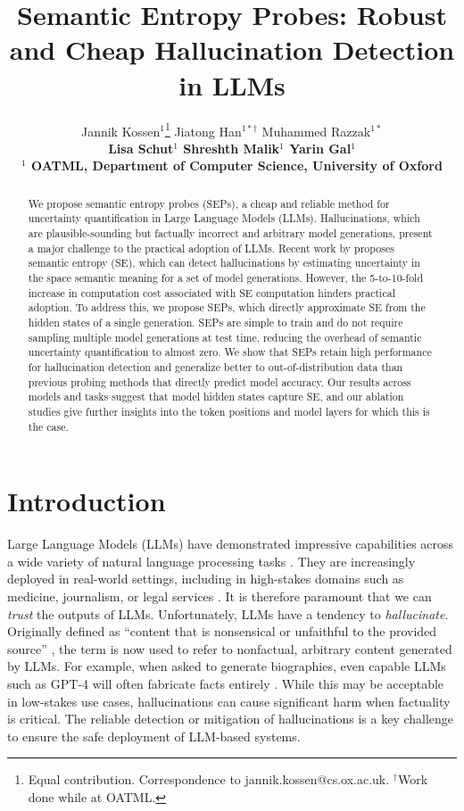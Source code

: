 \documentclass{article}
\title{Semantic Entropy Probes: Robust and Cheap Hallucination Detection in LLMs}
\author{%
  Jannik Kossen$^{1}$\thanks{Equal contribution. Correspondence to jannik.kossen@cs.ox.ac.uk. $^\dagger$Work done while at OATML.}
  \phantom{123}
  Jiatong Han$^{1*\dagger}$
  \phantom{123}
  Muhammed Razzak$^{1*}$
  \\[.5em]
  \bfseries{
  Lisa Schut$^{1}$ 
  \phantom{123}
  Shreshth Malik$^{1}$ 
  \phantom{123}
  Yarin Gal$^{1}$
  }
  \\[1em]
  $^1$ OATML, Department of Computer Science, University of Oxford
}
\begin{document}
\maketitle


\begin{abstract}
We propose semantic entropy probes (SEPs), a cheap and reliable method for uncertainty quantification in Large Language Models (LLMs).
Hallucinations, which are plausible-sounding but factually incorrect and arbitrary model generations, present a major challenge to the practical adoption of LLMs.
Recent work by \citet{farquhar2024detecting} proposes semantic entropy (SE), which can detect hallucinations by estimating uncertainty in the space semantic meaning for a set of model generations.
However, the 5-to-10-fold increase in computation cost associated with SE computation hinders practical adoption.
To address this, we propose SEPs, which directly approximate SE from the hidden states of a single generation.
SEPs are simple to train and do not require sampling multiple model generations at test time, reducing the overhead of semantic uncertainty quantification to almost zero.
We show that SEPs retain high performance for hallucination detection and generalize better to out-of-distribution data than previous probing methods that directly predict model accuracy.
Our results across models and tasks suggest that model hidden states capture SE, and our ablation studies give further insights into the token positions and model layers for which this is the case.
\end{abstract}

\section{Introduction}
\label{sec:introduction}

Large Language Models (LLMs) have demonstrated impressive capabilities across a wide variety of natural language processing tasks \citep{touvron2023llama,touvron2023llama2,openai2023gpt4,gemini,brown2020language}.
They are increasingly deployed in real-world settings, including in high-stakes domains such as medicine, journalism, or legal services \citep{singhal2022large,Weiser2023-vu,Opdahl2023-xe,Shen2023-uh}.
It is therefore paramount that we can \emph{trust} the outputs of LLMs.
Unfortunately, LLMs have a tendency to \emph{hallucinate}.
Originally defined as ``content that is nonsensical or unfaithful to the provided source'' \citep{maynez2020faithfulness,Filippova2020-dv,ji2023survey}, the term is now used to refer to nonfactual, arbitrary content generated by LLMs. 
For example, when asked to generate biographies, even capable LLMs such as GPT-4 will often fabricate facts entirely \citep{min2023factscore,tian2023finetuning,farquhar2024detecting}.
While this may be acceptable in low-stakes use cases, hallucinations can cause significant harm when factuality is critical.
The reliable detection or mitigation of hallucinations is a key challenge to ensure the safe deployment of LLM-based systems.
\end{document}
